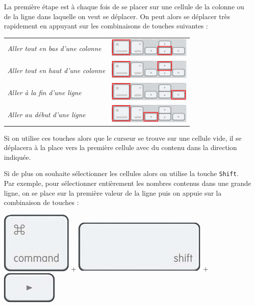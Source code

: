 La première étape est à chaque fois de se placer sur une cellule de la colonne ou de la ligne dans laquelle on veut se déplacer. On peut alors se déplacer très rapidement en appuyant sur les combinaisons de touches suivantes :

\begin{center}
	\begin{tabular}{ll}
		\textsl{Aller tout en bas d'une colonne} & \includegraphics[width=4cm]{./images/tableur03/clavierCmDdown} \\     
		\textsl{Aller tout en haut d'une colonne} & \includegraphics[width=4cm]{./images/tableur03/clavierCmDup} \\  
		\textsl{Aller à la fin d'une ligne} & \includegraphics[width=4cm]{./images/tableur03/clavierCmDright} \\  
		\textsl{Aller au début d'une ligne} & \includegraphics[width=4cm]{./images/tableur03/clavierCmDleft} \\  
	\end{tabular}
\end{center}

Si on utilise ces touches alors que le curseur se trouve sur une cellule vide, il se déplacera à la place vers la première cellule avec du contenu dans la direction indiquée.

Si de plus on souhaite sélectionner les cellules alors on utilise la touche \texttt{Shift}. Par exemple, pour sélectionner entièrement les nombres contenus dans une grande ligne, on se place sur la première valeur de la ligne puis on appuie sur la combinaison de touches :

\begin{center}
	\includegraphics[scale=1.5]{./images/tableur03/clavierCmd}  + \includegraphics[scale=1.5]{./images/tableur03/clavierShift} + \includegraphics[scale=1.5]{./images/tableur03/clavierRight}
\end{center}